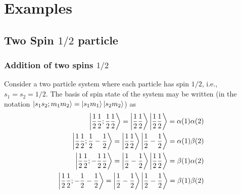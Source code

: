 \section{Examples}
\subsection{Two Spin $1/2$ particle}
\subsubsection{Addition of two spins $1/2$}
Consider a two particle system where each particle has spin $1/2$, i.e., $s_1=s_2 = 1/2$. The basis of spin state of the system may be written (in the notation $\ket{s_1 s_2; m_1 m_2} = \ket{s_1 m_1}\ket{s_2 m_2}$) as
\begin{align*}
\ket{\frac{1}{2} \frac{1}{2}; \frac{1}{2} \frac{1}{2}} = \ket{\frac{1}{2} \frac{1}{2}} \ket{\frac{1}{2} \frac{1}{2}} = \alpha(1)\alpha(2) \\
\ket{\frac{1}{2} \frac{1}{2}; \frac{1}{2} -\frac{1}{2}} = \ket{\frac{1}{2} \frac{1}{2}} \ket{\frac{1}{2} -\frac{1}{2}} = \alpha(1)\beta(2) \\
\ket{\frac{1}{2} \frac{1}{2}; -\frac{1}{2} \frac{1}{2}} = \ket{\frac{1}{2} -\frac{1}{2}} \ket{\frac{1}{2} \frac{1}{2}} = \beta(1)\alpha(2) \\
\ket{\frac{1}{2} \frac{1}{2}; -\frac{1}{2} -\frac{1}{2}} = \ket{\frac{1}{2} -\frac{1}{2}} \ket{\frac{1}{2} -\frac{1}{2}} = \beta(1)\beta(2)
\end{align*}

